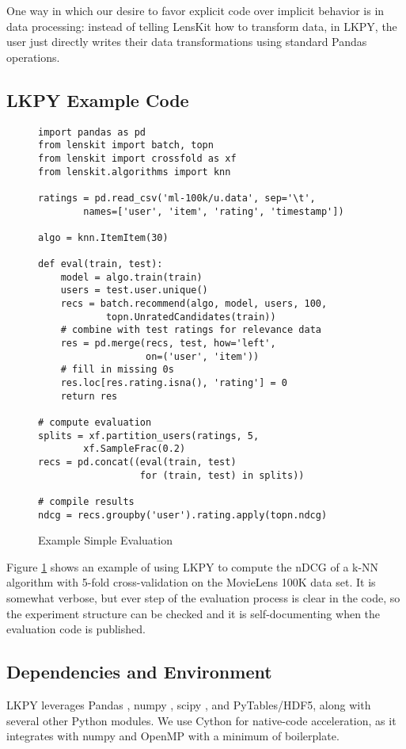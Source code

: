 One way in which our desire to favor explicit code over implicit behavior is in data processing: instead of telling LensKit how to transform data, in LKPY, the user just directly writes their data transformations using standard Pandas operations.

\subsection{LKPY Example Code}

\begin{figure}[tb]
\begin{verbatim}
import pandas as pd
from lenskit import batch, topn
from lenskit import crossfold as xf
from lenskit.algorithms import knn

ratings = pd.read_csv('ml-100k/u.data', sep='\t',
        names=['user', 'item', 'rating', 'timestamp'])

algo = knn.ItemItem(30)

def eval(train, test):
    model = algo.train(train)
    users = test.user.unique()
    recs = batch.recommend(algo, model, users, 100,
            topn.UnratedCandidates(train))
    # combine with test ratings for relevance data
    res = pd.merge(recs, test, how='left',
                   on=('user', 'item'))
    # fill in missing 0s
    res.loc[res.rating.isna(), 'rating'] = 0
    return res

# compute evaluation
splits = xf.partition_users(ratings, 5,
        xf.SampleFrac(0.2)
recs = pd.concat((eval(train, test)
                  for (train, test) in splits))

# compile results
ndcg = recs.groupby('user').rating.apply(topn.ndcg)
\end{verbatim}
\caption{Example Simple Evaluation}
\label{fig:example}
\end{figure}

Figure \ref{fig:example} shows an example of using LKPY to compute the nDCG of a k-NN algorithm with 5-fold cross-validation on the MovieLens 100K data set.
It is somewhat verbose, but ever step of the evaluation process is clear in the code, so the experiment structure can be checked and it is self-documenting when the evaluation code is published.

\subsection{Dependencies and Environment}

LKPY leverages Pandas \citep{McKinney2010-gs}, numpy \citep{Oliphant2006-vd}, scipy \citep{Oliphant2007-ql}, and PyTables/HDF5, along with several other Python modules.
We use Cython \citep{Behnel2011-uz} for native-code acceleration, as it integrates with numpy and OpenMP with a minimum of boilerplate.

